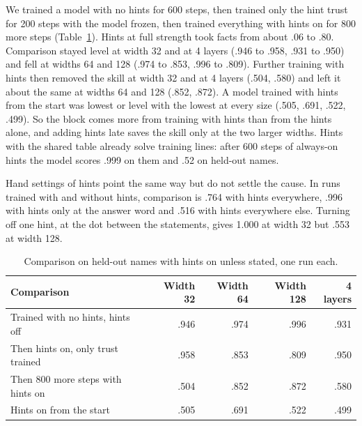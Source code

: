\documentclass[11pt]{article}
\begin{document}
We trained a model with no hints for 600 steps, then trained only the hint trust for 200 steps with the model frozen, then trained everything with hints on for 800 more steps (Table~\ref{tab:late}). Hints at full strength took facts from about .06 to .80. Comparison stayed level at width 32 and at 4 layers (.946 to .958, .931 to .950) and fell at widths 64 and 128 (.974 to .853, .996 to .809). Further training with hints then removed the skill at width 32 and at 4 layers (.504, .580) and left it about the same at widths 64 and 128 (.852, .872). A model trained with hints from the start was lowest or level with the lowest at every size (.505, .691, .522, .499). So the block comes more from training with hints than from the hints alone, and adding hints late saves the skill only at the two larger widths. Hints with the shared table already solve training lines: after 600 steps of always-on hints the model scores .999 on them and .52 on held-out names.

Hand settings of hints point the same way but do not settle the cause. In runs trained with and without hints, comparison is .764 with hints everywhere, .996 with hints only at the answer word and .516 with hints everywhere else. Turning off one hint, at the dot between the statements, gives 1.000 at width 32 but .553 at width 128.

\begin{table}[h]\centering\small
\begin{tabular}{lrrrr}\toprule
Comparison & Width 32 & Width 64 & Width 128 & 4 layers\\\midrule
Trained with no hints, hints off & .946 & .974 & .996 & .931\\
Then hints on, only trust trained & .958 & .853 & .809 & .950\\
Then 800 more steps with hints on & .504 & .852 & .872 & .580\\
Hints on from the start & .505 & .691 & .522 & .499\\\bottomrule
\end{tabular}
\caption{Comparison on held-out names with hints on unless stated, one run each.}\label{tab:late}
\end{table}
\end{document}
